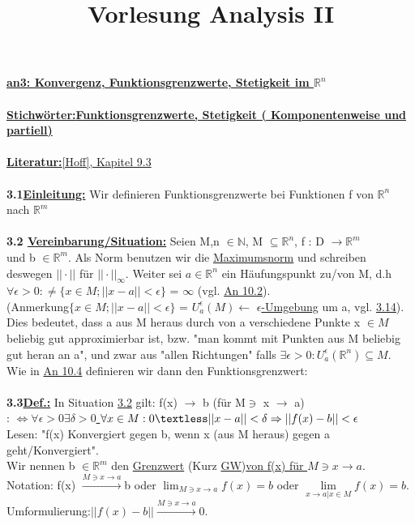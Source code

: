 \documentclass[]{scrartcl}
\title{Vorlesung Analysis II}
\begin{document}
	\maketitle
	\textbf{\underline{an3: Konvergenz, Funktionsgrenzwerte, Stetigkeit im 
	$\mathbb{R}^n$}}\\
	\\
	\textbf{\underline{\underline{Stichwörter:}Funktionsgrenzwerte, Stetigkeit 
	( Komponentenweise und partiell)}} \\
	\\
	\textbf{\underline{Literatur:}}\ul{[Hoff], Kapitel 9.3}\\
	\\
	\textbf{3.1\underline{Einleitung:}} Wir definieren Funktionsgrenzwerte bei Funktionen f von $\mathbb{R}^n$ nach $\mathbb{R}^m$\\
	\\
	\textbf{3.2 \underline{Vereinbarung/Situation:}} Seien M,n $\in \mathbb{N}$, M $\subseteq \mathbb{R}^n$, f : D $\rightarrow \mathbb{R}^m$ \\
	und b $\in \mathbb{R}^m$. Als Norm benutzen wir die \ul{Maximumsnorm} und schreiben deswegen $||\cdot||$ für $||\cdot||_\infty$. Weiter sei $a \in \mathbb{R}^n$ ein Häufungspunkt zu/von M, d.h $\forall \epsilon > 0 : \neq $\ul{$\{x\in M; ||x-a||<\epsilon\}$} 
	= $\infty$ (vgl. \ul{An 10.2}).\\
	(Anmerkung\ul{$\{x\in M; ||x-a||<\epsilon\}$} = \ul{$U^\epsilon_a(M)$}$\leftarrow$ \ul{$\epsilon$-Umgebung} um a, vgl. \ul{3.14}).\\
	Dies bedeutet, dass a aus M heraus durch von a verschiedene Punkte x $\in M$ beliebig gut approximierbar ist, bzw. "man kommt mit Punkten aus M beliebig gut heran an a", und zwar aus "allen Richtungen" falls $\exists \epsilon > 0 : U^\epsilon_a(\mathbb{R}^n)\subseteq M$.\\
	Wie in \ul{An 10.4} definieren wir dann den Funktionsgrenzwert:
	\\\\
		
	\textbf{3.3\underline{Def.:}} In Situation \ul{3.2} gilt: f(x) $\rightarrow$ b (für M$\ni$ x $\rightarrow$ a)\\
	: \ul{$ \Leftrightarrow\forall \epsilon > 0 \exists \delta 
	> 0$ \hspace{5mm} $ \forall x \in M: 0\textless||x-a|| < \delta  
	\Rightarrow || f(x) - b || < \epsilon$}\\
	Lesen: "f(x) Konvergiert gegen b, wenn x (aus M heraus) gegen a 
	geht/Konvergiert".\\
	Wir nennen b $\in \mathbb{R}^m$ den  \ul{Grenzwert} (Kurz \ul{GW})\ul{von f(x) für $M \ni x \rightarrow a.$}\\
	Notation: f(x) $\xrightarrow[]{M\ni x \rightarrow a}$b oder $\lim_{M \ni x 
	\rightarrow a} f(x)=b$ oder $\lim\limits_{x\rightarrow a|x\in M}f(x)=b.$\\
	Umformulierung:$||f(x)-b||\xrightarrow{M\ni x\rightarrow a}0.$\\\\
	
\end{document}

